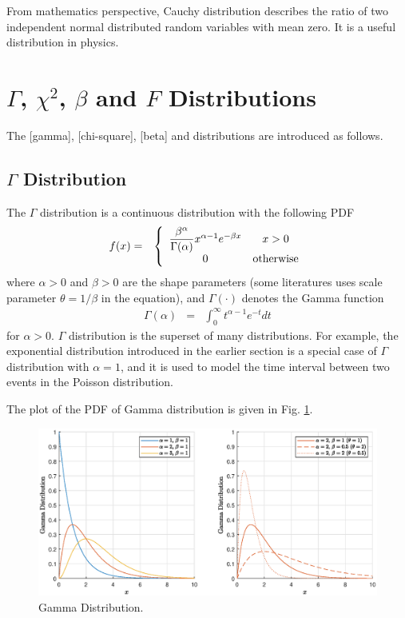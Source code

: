 From mathematics perspective, Cauchy distribution describes the ratio of two independent normal distributed random variables with mean zero. It is a useful distribution in physics.

\section{$\Gamma$, $\chi^2$, $\beta$ and $F$ Distributions}

The \mync{$\Gamma$}[gamma], [chi-square], \mync{$\beta$}[beta] and  distributions are introduced as follows.

\subsection{$\Gamma$ Distribution}

The $\Gamma$ distribution is a continuous distribution with the following PDF
\begin{eqnarray}
	f(x) &=& \left\{\begin{array}{cc}
		\dfrac{\beta^\alpha}{\Gamma(\alpha)}x^{\alpha-1}e^{-\beta x} & x > 0 \\
		0 & \textup{otherwise}
	\end{array}\right. \label{eq:gammapdf}
\end{eqnarray}
where $\alpha>0$ and $\beta>0$ are the shape parameters (some literatures uses scale parameter $\theta = 1/\beta$ in the equation), and $\Gamma(\cdot)$ denotes the Gamma function
\begin{eqnarray}
	\Gamma(\alpha) &=& \int_{0}^{\infty}t^{\alpha-1}e^{-t}dt \nonumber
\end{eqnarray}
for $\alpha > 0$. $\Gamma$ distribution is the superset of many distributions. For example, the exponential distribution introduced in the earlier section is a special case of $\Gamma$ distribution with $\alpha=1$, and it is used to model the time interval between two events in the Poisson distribution.

The plot of the PDF of Gamma distribution is given in Fig. \ref{fig:gamma_pdf}.
\begin{figure}
	\centering
	\includegraphics[width=350pt]{chapters/part-1/figures/gamma_pdf.eps}
	\caption{Gamma Distribution.} \label{fig:gamma_pdf}
\end{figure}

